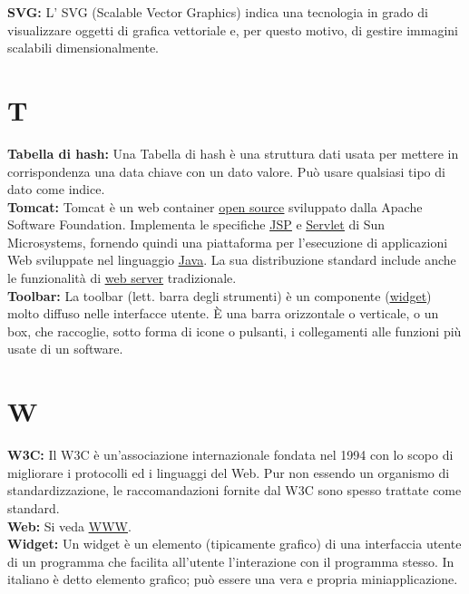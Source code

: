 \hypertarget{svg}{}
\textbf{SVG:}
L' SVG (Scalable Vector Graphics) indica una tecnologia in grado di visualizzare oggetti di grafica vettoriale e, per questo motivo, di gestire immagini scalabili dimensionalmente.\\

\section*{T}
\hypertarget{tabhash}{}
\textbf{Tabella di hash:}
Una Tabella di hash \` e una struttura dati usata per mettere in corrispondenza una data chiave con un dato valore. Pu\` o usare qualsiasi tipo di dato come indice.\\

\hypertarget{tomcat}{}
\textbf{Tomcat:}
Tomcat \` e un web container \hyperlink{opensource}{\underline{open source}} sviluppato dalla Apache Software Foundation. Implementa le specifiche \hyperlink{jsp}{\underline{JSP}} e \hyperlink{servlet}{\underline{Servlet}} di Sun Microsystems, fornendo quindi una piattaforma per l'esecuzione di applicazioni Web sviluppate nel linguaggio \hyperlink{java}{\underline{Java}}. La sua distribuzione standard include anche le funzionalit\` a di \hyperlink{serverweb}{\underline{web server}} tradizionale.\\

\hypertarget{toolbar}{}
\textbf{Toolbar:}
La toolbar (lett. barra degli strumenti) \` e un componente (\hyperlink{widget}{\underline{widget}}) molto diffuso nelle interfacce utente. \` E una barra orizzontale o verticale, o un box, che raccoglie, sotto forma di icone o pulsanti, i collegamenti alle funzioni pi\` u usate di un software.\\


\section*{W}
\hypertarget{w3c}{}
\textbf{W3C:}
Il W3C \`e un'associazione internazionale fondata nel 1994 con lo scopo di migliorare i protocolli ed i linguaggi del Web. Pur non essendo un organismo di standardizzazione, le raccomandazioni fornite dal W3C sono spesso trattate come standard.\\

\hypertarget{web}{}
\textbf{Web:}
Si veda \hyperlink{www}{\underline{WWW}}.\\

\hypertarget{widget}{}
\textbf{Widget:}
Un widget \` e un elemento (tipicamente grafico) di una interfaccia utente di un programma che facilita all'utente l'interazione con il programma stesso. In italiano \`  e detto  elemento grafico; pu\` o essere una vera e propria miniapplicazione.\\

